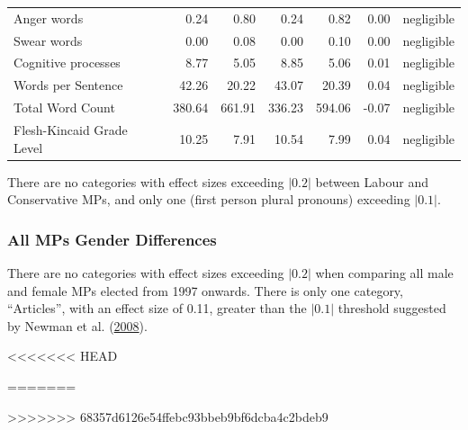 \documentclass[]{article}
\theoremstyle{definition}
\theoremstyle{definition}
\theoremstyle{definition}
\theoremstyle{remark}
\begin{document}
\begin{table}[H]
\begin{table}[H]
\begin{table}[H]
\begin{table}[H]
\begin{table}[H]
\begin{table}
\begin{tabular}[t]{lrrrrrl}
Anger words & 0.24 & 0.80 & 0.24 & 0.82 & 0.00 & negligible\\
Swear words & 0.00 & 0.08 & 0.00 & 0.10 & 0.00 & negligible\\
Cognitive processes & 8.77 & 5.05 & 8.85 & 5.06 & 0.01 & negligible\\
\addlinespace
Words per Sentence & 42.26 & 20.22 & 43.07 & 20.39 & 0.04 & negligible\\
Total Word Count & 380.64 & 661.91 & 336.23 & 594.06 & -0.07 & negligible\\
Flesh-Kincaid Grade Level & 10.25 & 7.91 & 10.54 & 7.99 & 0.04 & negligible\\
\bottomrule
\end{tabular}
\end{table}

There are no categories with effect sizes exceeding \(|0.2|\) between
Labour and Conservative MPs, and only one (first person plural pronouns)
exceeding \(|0.1|\).

\hypertarget{all-mps-gender-differences}{%
\subsubsection{All MPs Gender
Differences}\label{all-mps-gender-differences}}

There are no categories with effect sizes exceeding \(|0.2|\) when
comparing all male and female MPs elected from 1997 onwards. There is
only one category, ``Articles'', with an effect size of 0.11, greater
than the \(|0.1|\) threshold suggested by Newman et al.
(\protect\hyperlink{ref-newman2008}{2008}).

<<<<<<< HEAD
\begin{table}[H]
=======
\begin{table}
>>>>>>> 68357d6126e54ffebc93bbeb9bf6dcba4c2bdeb9


\end{table}
\end{table}
\end{table}
\end{table}
\end{table}
\end{table}
\end{table}
\end{document}
